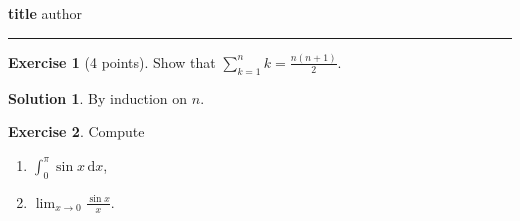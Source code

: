 \documentclass[11pt,a4paper]{article}
\theoremstyle{definition}
\newtheorem{exercise}{Exercise}
\newtheorem*{solution}{Solution}
\begin{document}
\noindent\textbf{{{title}}} \hfill {{author}} \\
\rule{\linewidth}{0.4pt}

\begin{exercise}[4 points]
  Show that $\sum_{k=1}^{n} k = \frac{n(n+1)}{2}$.
\end{exercise}

\begin{solution}
  By induction on $n$.
\end{solution}

\begin{exercise}
  Compute
  \begin{enumerate}[label=(\alph*)]
    \item $\int_0^\pi \sin x \,\mathrm{d}x$,
    \item $\lim_{x\to 0} \frac{\sin x}{x}$.
  \end{enumerate}
\end{exercise}
\end{document}
